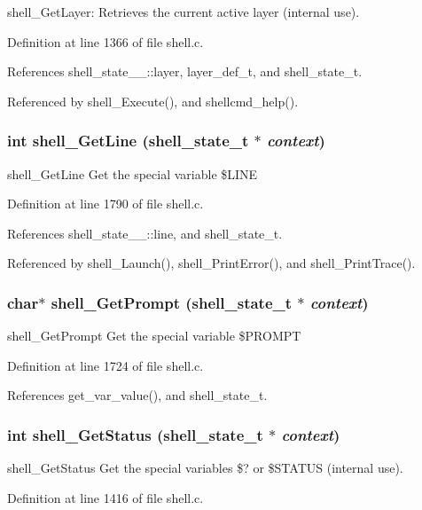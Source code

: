 shell\_\-Get\-Layer: Retrieves the current active layer (internal use). 

Definition at line 1366 of file shell.c.

References shell\_\-state\_\-\_\-::layer, layer\_\-def\_\-t, and shell\_\-state\_\-t.

Referenced by shell\_\-Execute(), and shellcmd\_\-help().
\subsubsection{\setlength{\rightskip}{0pt plus 5cm}int shell\_\-Get\-Line ({\bf shell\_\-state\_\-t} $\ast$ {\em context})}\label{shell_8c_a43}


shell\_\-Get\-Line Get the special variable \$LINE 

Definition at line 1790 of file shell.c.

References shell\_\-state\_\-\_\-::line, and shell\_\-state\_\-t.

Referenced by shell\_\-Launch(), shell\_\-Print\-Error(), and shell\_\-Print\-Trace().
\subsubsection{\setlength{\rightskip}{0pt plus 5cm}char$\ast$ shell\_\-Get\-Prompt ({\bf shell\_\-state\_\-t} $\ast$ {\em context})}\label{shell_8c_a40}


shell\_\-Get\-Prompt Get the special variable \$PROMPT 

Definition at line 1724 of file shell.c.

References get\_\-var\_\-value(), and shell\_\-state\_\-t.
\subsubsection{\setlength{\rightskip}{0pt plus 5cm}int shell\_\-Get\-Status ({\bf shell\_\-state\_\-t} $\ast$ {\em context})}\label{shell_8c_a32}


shell\_\-Get\-Status Get the special variables \$? or \$STATUS (internal use). 

Definition at line 1416 of file shell.c.

